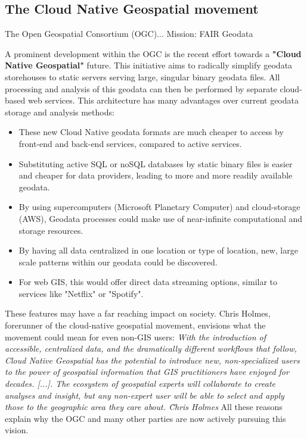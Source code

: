 \subsection{The Cloud Native Geospatial movement}


The Open Geospatial Consortium (OGC)...
Mission: FAIR Geodata 

A prominent development within the OGC is the recent effort towards a \textbf{"Cloud Native Geospatial"} future. 
This initiative aims to radically simplify geodata storehouses to static servers serving large, singular binary geodata files. All processing and analysis of this geodata can then be performed by separate cloud-based web services. 
This architecture has many advantages over current geodata storage and analysis methods:
\begin{itemize}
  \item These new Cloud Native geodata formats are much cheaper to access by front-end and back-end services, compared to active services.
  \item Substituting active SQL or noSQL databases by static binary files is easier and cheaper for data providers, leading to more and more readily available geodata.
  \item By using supercomputers (Microsoft Planetary Computer) and cloud-storage (AWS), Geodata processes could make use of near-infinite computational and storage resources. 
  \item By having all data centralized in one location or type of location, new, large scale patterns within our geodata could be discovered.  
  \item For web GIS, this would offer direct data streaming options, similar to services like "Netflix" or "Spotify".  
\end{itemize}

These features may have a far reaching impact on society. Chris Holmes, forerunner of the cloud-native geospatial movement, envisions what the movement could mean for even non-GIS users: 
\emph{
  With the introduction of accessible, centralized data, and the dramatically different workflows that follow, Cloud Native Geospatial has the potential to introduce new, non-specialized users to the power of geospatial information that GIS practitioners have enjoyed for decades. [...]. The ecosystem of geospatial experts will collaborate to create analyses and insight, but any non-expert user will be able to select and apply those to the geographic area they care about. \~ Chris Holmes
}
All these reasons explain why the OGC and many other parties are now actively pursuing this vision.

